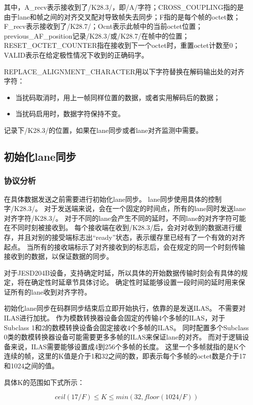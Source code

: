 \documentclass[UTF8]{ctexart}
\begin{document}
其中，A\_recv表示接收到了/K28.3/，即/A/字符；CROSS\_COUPLING指的是由于lane和帧之间的对齐交叉配对导致帧失去同步；F指的是每个帧的octet数；F\_recv表示接收到了/K28.7/；Ocnt表示此帧中的当前octet位置；previous\_AF\_position记录/K28.3/或/K28.7/在帧中的位置；RESET\_OCTET\_COUNTER指在接收到下一个octet时，重置octet计数至0；VALID表示在给定极性情况下收到的正确码字。

REPLACE\_ALIGNMENT\_CHARACTER用以下字符替换在解码输出处的对齐字符：
\begin{itemize}
	\item 当扰码取消时，用上一帧同样位置的数据，或者实用解码后的数据；
	\item 当扰码启用时，数据字符保持不变。
\end{itemize}
记录下/K28.3/的位置，如果在lane同步或者lane对齐监测中需要。

\subsection{初始化lane同步}

\subsubsection{协议分析}

在具体数据发送之前需要进行初始化lane同步。
lane同步使用具体的控制字/K28.3/。
对于发送端来说，会在一个固定的时间点，所有的lane同时发送lane对齐字符/K28.3/。
对于不同的lane会产生不同的延时，不同lane的对齐字符可能在不同时刻被接收到。
每个接收端在收到/K28.3/后，会对对收到的数据进行缓存，并且对别的接受端标志出“ready”状态，表示缓存里已经有了一个有效的对齐起点。
当所有的接收端标示了对齐接收到的标志后，会在规定的同一个时刻传输接收到的数据，以保证数据的同步。

对于JESD204B设备，支持确定时延，所以具体的开始数据传输时刻会有具体的规定，将在确定性时延章节具体讨论。
确定性时延能够设置一段时间的延时用来保证所有的lane收到对齐字符。

初始化lane同步在码群同步结束后立即开始执行，依靠的是发送ILAS。
不需要对ILAS进行加扰。
作为模数转换器设备会固定的传输4个多帧的ILAS，对于Subclass 1和2的数模转换设备会固定接收4个多帧的ILAS。
同时配置多个Subclass 0类的数模转换器设备可能需要更多多帧的ILAS来保证lane的对齐。
而对于逻辑设备来说，ILAS需要能够设置成4到256个多帧的长度。
这里一个多帧就指的是K个连续的帧，这里的K值是介于1和32之间的数，即表示每个多帧的octet数是介于17和1024之间的值。

具体K的范围如下式所示：

$$ceil(17/F) \le K \le min(32, floor(1024/F))$$
\end{document}
